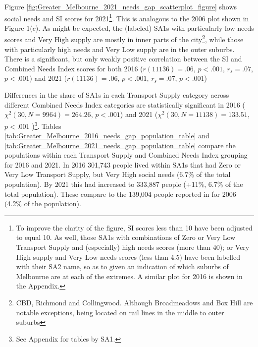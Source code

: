 \documentclass[preprint, 3p,
authoryear]{elsarticle} %
\begin{document}
Figure \ref{fig:Greater_Melbourne_2021_needs_gap_scatterplot_figure}
shows social needs and SI scores for 2021\footnote{To improve the
  clarity of the figure, SI scores less than 10 have been adjusted to
  equal 10. As well, those SA1s with combinations of Zero or Very Low
  Transport Supply and (especially) high needs scores (more than 40); or
  Very High supply and Very Low needs scores (less than 4.5) have been
  labelled with their SA2 name, so as to given an indication of which
  suburbs of Melbourne are at each of the extremes. A similar plot for
  2016 is shown in the Appendix.}. This is analogous to the 2006 plot
shown in Figure 1(c). As might be expected, the (labeled) SA1s with
particularly low needs scores and Very High supply are mostly in inner
parts of the city\footnote{CBD, Richmond and Collingwood. Although
  Broadmeadows and Box Hill are notable exceptions, being located on
  rail lines in the middle to outer suburbs}, while those with
particularly high needs and Very Low supply are in the outer suburbs.
There is a significant, but only weakly positive correlation between the
SI and Combined Needs Index scores for both 2016 (\(r(11136) = .06\),
\(p < .001\), \(r_s =.07\), \(p < .001\)) and 2021 (\(r(11136) = .06\),
\(p < .001\), \(r_s =.07\), \(p < .001\))

Differences in the share of SA1s in each Transport Supply category
across different Combined Needs Index categories are statistically
significant in 2016 (\(\chi^2(30, N = 9964) = 264.26\), \(p < .001\))
and 2021 (\(\chi^2(30, N = 11138) = 133.51\), \(p < .001\) )\footnote{See
  Appendix for tables by SA1.}. Tables
\ref{tab:Greater_Melbourne_2016_needs_gap_population_table} and
\ref{tab:Greater_Melbourne_2021_needs_gap_population_table} compare the
populations within each Transport Supply and Combined Needs Index
grouping for 2016 and 2021. In 2016 301,743 people lived within SA1s
that had Zero or Very Low Transport Supply, but Very High social needs
(6.7\% of the total population). By 2021 this had increased to 333,887
people (+11\%, 6.7\% of the total population). These compare to the
139,004 people reported in \citet{currie2010identifying} for 2006 (4.2\%
of the population).
\end{document}
